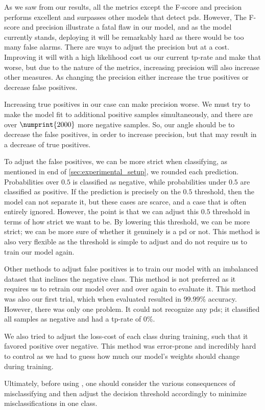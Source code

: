 As we saw from our results, all the metrics except the F-score and precision performs excellent and surpasses other models that detect \acp{pd}. However, The F-score and precision illustrate a fatal flaw in our model, and as the model currently stands, deploying it will be remarkably hard as there would be too many false alarms. There are ways to adjust the precision but at a cost. Improving it will with a high likelihood cost us our current tp-rate and make that worse, but due to the nature of the metrics, increasing precision will also increase other measures. As changing the precision either increase the true positives or decrease false positives.

Increasing true positives in our case can make precision worse. We must try to make the model fit to additional positive samples simultaneously, and there are over $\numprint{2000}$ more negative samples. So, our angle should be to decrease the false positives, in order to increase precision, but that may result in a decrease of true positives. 

To adjust the false positives, we can be more strict when classifying, as mentioned in end of \autoref{sec:experimental_setup}, we rounded each prediction. Probabilities over $0.5$ is classified as negative, while probabilities under $0.5$ are classified as positive. If the prediction is precisely on the $0.5$ threshold, then the model can not separate it, but these cases are scarce, and a case that is often entirely ignored. However, the point is that we can adjust this $0.5$ threshold in terms of how strict we want to be. By lowering this threshold, we can be more strict; we can be more sure of whether it genuinely is a \ac{pd} or not. This method is also very flexible as the threshold is simple to adjust and do not require us to train our model again.

Other methods to adjust false positives is to train our model with an imbalanced dataset that inclines the negative class. This method is not preferred as it requires us to retrain our model over and over again to evaluate it. This method was also our first trial, which when evaluated resulted in $99.99\%$ accuracy. However, there was only one problem. It could not recognize any \acp{pd}; it classified all samples as negative and had a tp-rate of $0\%$.

We also tried to adjust the loss-cost of each class during training, such that it favored positive over negative. This method was error-prone and incredibly hard to control as we had to guess how much our model's weights should change during training.

Ultimately, before using \project, one should consider the various consequences of misclassifying and then adjust the decision threshold accordingly to minimize misclassifications in one class.